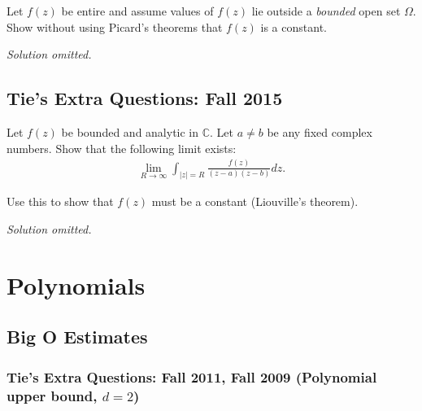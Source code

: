 \begin{problem}[?]

Let \(f(z)\) be entire and assume values of \(f(z)\) lie outside a
\emph{bounded} open set \(\Omega\). Show without using Picard's theorems
that \(f(z)\) is a constant.

\end{problem}

\emph{Solution omitted.}

\hypertarget{ties-extra-questions-fall-2015-3}{%
\subsection{Tie's Extra Questions: Fall
2015}\label{ties-extra-questions-fall-2015-3}}

\begin{problem}[?]

Let \(f(z)\) be bounded and analytic in \(\mathbb C\). Let \(a \neq b\)
be any fixed complex numbers. Show that the following limit exists:
\begin{align*}
\lim_{R \rightarrow \infty} \int_{|z|=R} \frac{f(z)}{(z-a)(z-b)} dz
.\end{align*}

Use this to show that \(f(z)\) must be a constant (Liouville's theorem).

\end{problem}

\emph{Solution omitted.}

\hypertarget{polynomials}{%
\section{Polynomials}\label{polynomials}}

\hypertarget{big-o-estimates}{%
\subsection{Big O Estimates}\label{big-o-estimates}}

\hypertarget{ties-extra-questions-fall-2011-fall-2009-polynomial-upper-bound-d2}{%
\subsubsection{\texorpdfstring{Tie's Extra Questions: Fall 2011, Fall
2009 (Polynomial upper bound,
\(d=2\))}{Tie's Extra Questions: Fall 2011, Fall 2009 (Polynomial upper bound, d=2)}}\label{ties-extra-questions-fall-2011-fall-2009-polynomial-upper-bound-d2}}


